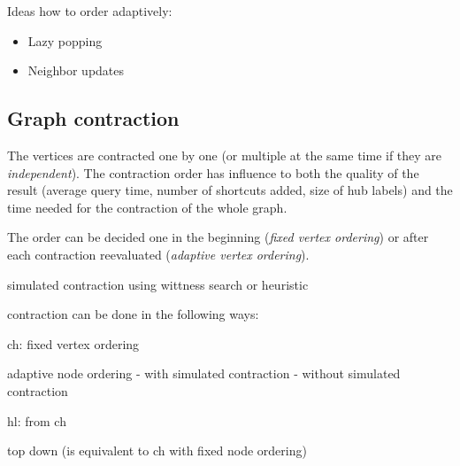 Ideas how to order adaptively:
\begin{itemize}
      \item
            Lazy popping


      \item
            Neighbor updates
\end{itemize}

\subsection{Graph contraction}
The vertices are contracted one by one (or multiple at the same time if they are \emph{independent}). The contraction order has influence to both the quality of the result (average query time, number of shortcuts added, size of hub labels) and the time needed for the contraction of the whole graph.

The order can be decided one in the beginning (\emph{fixed vertex ordering}) or after each contraction reevaluated (\emph{adaptive vertex ordering}).

simulated contraction using wittness search or heuristic

contraction can be done in the following ways:

ch:
fixed vertex ordering

adaptive node ordering
- with simulated contraction
- without simulated contraction


hl:
from ch

top down (is equivalent to ch with fixed node ordering)



